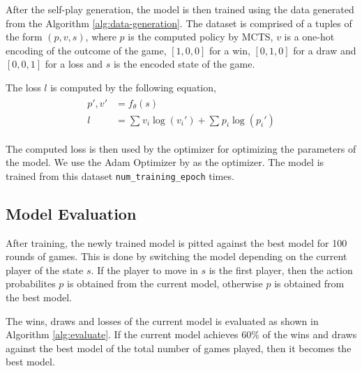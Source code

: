 After the self-play generation, the model is then trained using the data generated from the Algorithm \ref{alg:data-generation}. The dataset is comprised of a tuples of the form $(p, v, s)$, where $p$ is the computed policy by MCTS, $v$ is a one-hot encoding of the outcome of the game, $[1, 0, 0]$ for a win, $[0, 1, 0]$ for a draw and $[0, 0, 1]$ for a loss and $s$ is the encoded state of the game.

The loss $l$ is computed by the following equation,
\begin{align}
  \begin{split}
      p', v' &= f_{\theta}(s) \\ l &= \sum_{}^{} v_{i}\log(v_{i}') + \sum_{}^{}p_{i}\log(p_{i}')
  \end{split}
  \label{eq:loss}
\end{align}

The computed loss is then used by the optimizer for optimizing the parameters of the model. We use the Adam Optimizer by \cite{kingma2017adammethodstochasticoptimization} as the optimizer. The model is trained from this dataset \texttt{num\_training\_epoch} times.

\subsection{Model Evaluation}

After training, the newly trained model is pitted against the best model for 100 rounds of games. This is done by switching the model depending on the current player of the state $s$. If the player to move in $s$ is the first player, then the action probabilites $p$ is obtained from the current model, otherwise $p$ is obtained from the best model.

The wins, draws and losses of the current model is evaluated as shown in Algorithm \ref{alg:evaluate}. If the current model achieves $60\%$ of the wins and draws against the best model of the total number of games played, then it becomes the best model. 

